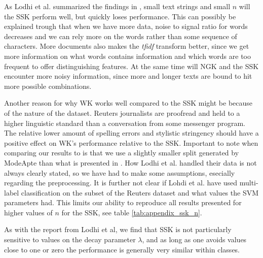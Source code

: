 



As Lodhi et al. summarized the findings in \cite{lodhi}, small text strings and small $ n $ will the SSK perform well, but quickly loses performance. This can possibly be explained trough that when we have more data, noise to signal ratio for words decreases and we can rely more on the words rather than some sequence of characters. More documents also makes the  \textit{tfidf} transform better, since we get more information on what words contains information and which words are too frequent to offer distinguishing features. At the same time will NGK and the SSK encounter more noisy information, since more and longer texts are bound to hit more possible combinations. 

Another reason for why WK works well compared to the SSK might be because of the nature of the dataset. Reuters journalists are proofread and held to a higher linguistic standard than  a conversation from some messenger program. The relative lower amount of spelling errors and stylistic stringency should have a positive effect on WK's performance relative to the SSK. Important to note when comparing our results to \cite{lodhi} is that we use a slightly smaller split generated by ModeApte than what is presented in \cite{lodhi}. How Lodhi et al. handled their data is not always clearly stated, so we have had to make some assumptions, esecially regarding the preprocessing. It is further not clear if Lohdi et al. have used multi-label classification on the subset of the Reuters dataset and what values the SVM parameters had. This limits our ability to reproduce all results presented for higher values of $ n $ for the SSK, see table \ref{tab:appendix_ssk_n}.

As with the report from Lodhi et al, we find that SSK is not particularly sensitive to values on the decay parameter $ \lambda $, and as long as one avoids values close to one or zero the performance is generally very similar within classes.

